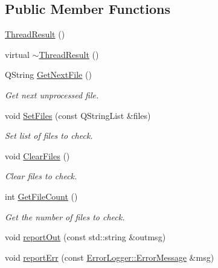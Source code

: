 \subsection*{Public Member Functions}
\begin{DoxyCompactItemize}
\item 
\hyperlink{class_thread_result_a8e410a07d55f72f063d87d54c20bd77b}{Thread\-Result} ()
\item 
virtual \hyperlink{class_thread_result_ab4e747ab75b907f1a04cd0600236624b}{$\sim$\-Thread\-Result} ()
\item 
Q\-String \hyperlink{class_thread_result_ae08020c825703e0edecbd3fbaf88ba5c}{Get\-Next\-File} ()
\begin{DoxyCompactList}\small\item\em Get next unprocessed file. \end{DoxyCompactList}\item 
void \hyperlink{class_thread_result_a3dc6c68b45ffc577ffe0e81138b2022b}{Set\-Files} (const Q\-String\-List \&files)
\begin{DoxyCompactList}\small\item\em Set list of files to check. \end{DoxyCompactList}\item 
void \hyperlink{class_thread_result_af69e130dc7ff9e5a293a4a9d977eb71d}{Clear\-Files} ()
\begin{DoxyCompactList}\small\item\em Clear files to check. \end{DoxyCompactList}\item 
int \hyperlink{class_thread_result_a3486ba8dc0ec8b48418bffba61bd51c1}{Get\-File\-Count} ()
\begin{DoxyCompactList}\small\item\em Get the number of files to check. \end{DoxyCompactList}\item 
void \hyperlink{class_thread_result_a92e60f6281e6f107f62252954b061f89}{report\-Out} (const std\-::string \&outmsg)
\item 
void \hyperlink{class_thread_result_ac894491441813236e0baf284ee8d3621}{report\-Err} (const \hyperlink{class_error_logger_1_1_error_message}{Error\-Logger\-::\-Error\-Message} \&msg)
\end{DoxyCompactItemize}

